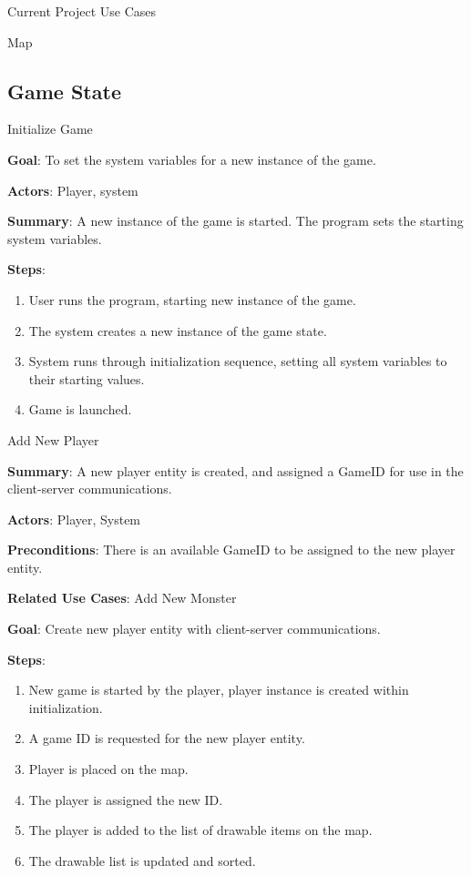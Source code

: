 \documentclass[12pt]{report}
\begin{document}
\begin{chapter}{Current Project Use Cases}
\begin{section}{Map}
  \section{Game State}

    \begin{subsection}{Initialize Game}

      \textbf{Goal}: 
      To set the system variables for a new instance of the game.

      \textbf{Actors}: 
      Player, system

      \textbf{Summary}: 
      A new instance of the game is started. The program sets the starting system variables.

      \textbf{Steps}:
      \begin{enumerate}
	\item User runs the program, starting new instance of the game.
	\item The system creates a new instance of the game state.
	\item System runs through initialization sequence, setting all system variables to their starting values.
	\item Game is launched.
      \end{enumerate}
    \end{subsection}

    \begin{subsection}{Add New Player}

      \textbf{Summary}: 
      A new player entity is created, and assigned a GameID for use in the client-server communications.

      \textbf{Actors}: 
      Player, System

      \textbf{Preconditions}: 
      There is an available GameID to be assigned to the new player entity.

      \textbf{Related Use Cases}: 
      Add New Monster

      \textbf{Goal}:
      Create new player entity with client-server communications.

      \textbf{Steps}:
      \begin{enumerate}
	\item New game is started by the player, player instance is created within initialization.
	\item A game ID is requested for the new player entity.
	\item Player is placed on the map.
	\item The player is assigned the new ID.
	\item The player is added to the list of drawable items on the map.
	\item The drawable list is updated and sorted.
      \end{enumerate}
    \end{subsection}
    

\end{section}
\end{chapter}
\end{document}

